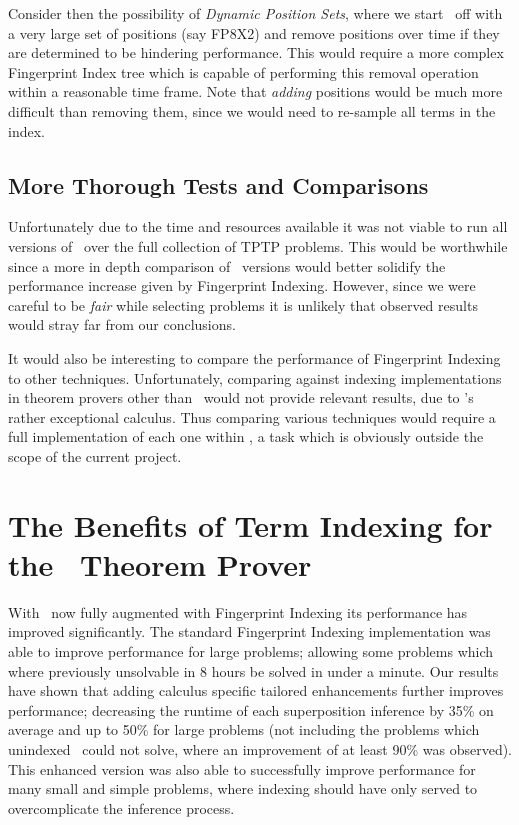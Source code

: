 Consider then the possibility of \emph{Dynamic Position Sets}, where we start \beagle\ off with a
very large set of positions (say FP8X2) and remove positions over time if they
are determined to be hindering performance. This would require a more complex Fingerprint
Index tree which is capable of performing this removal operation within a reasonable
time frame. Note that \emph{adding} positions would be much more difficult than removing them, since
we would need to re-sample all terms in the index.

\subsection{More Thorough Tests and Comparisons}

Unfortunately due to the time and resources available it was not viable to run
all versions of \beagle\ over the full collection of TPTP problems. This would
be worthwhile since a more in depth comparison 
of \beagle\ versions would better solidify the performance increase given by Fingerprint Indexing.
However, since we were careful to be \emph{fair}
while selecting problems it is unlikely that observed results would stray far
from our conclusions.

It would also be interesting to compare the performance of Fingerprint Indexing
to other techniques. Unfortunately, comparing against indexing implementations in theorem provers other
than \beagle\ would not provide relevant results, due to \beagle's rather
exceptional calculus. Thus comparing various techniques would require a full
implementation of each one within \beagle, a task which is obviously outside the scope of the current
project. 

\section{The Benefits of Term Indexing for the \Beagle\ Theorem Prover }
\label{sec:why}

With \beagle\ now fully augmented with Fingerprint Indexing its performance
has improved significantly. The standard Fingerprint Indexing implementation was
able to improve performance for large problems; allowing some
problems which where previously unsolvable in 8 hours be solved in under a minute.
Our results have shown that adding calculus specific tailored
enhancements further improves performance; decreasing the runtime of each superposition inference by 35\%
on average and up to 50\% for large problems (not including the problems which unindexed \beagle\ could not solve,
where an improvement of at least 90\% was observed). This enhanced version
was also able to successfully improve performance for many small and simple problems,
where indexing should have only served to overcomplicate the inference process.

